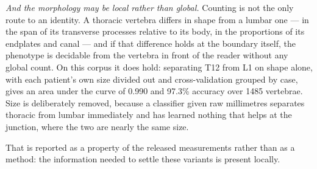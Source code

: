 \documentclass[aapm,mph,amsmath,amssymb,reprint,linenumbers]{revtex4-2}
\begin{document}
\emph{And the morphology may be local rather than global.} Counting is not the only route to
an identity. A thoracic vertebra differs in shape from a lumbar one --- in the span of its
transverse processes relative to its body, in the proportions of its endplates and canal ---
and if that difference holds at the boundary itself, the phenotype is decidable from the
vertebra in front of the reader without any global count. On this corpus it does hold:
separating T12 from L1 on shape alone, with each patient's own size divided out and
cross-validation grouped by case, gives an area under the curve of 0.990 and 97.3\%
accuracy over 1485 vertebrae. Size is deliberately removed, because a classifier given raw
millimetres separates thoracic from lumbar immediately and has learned nothing that helps at
the junction, where the two are nearly the same size.

That is reported as a property of the released measurements rather than as a method: the
information needed to settle these variants is present locally.
\end{document}
